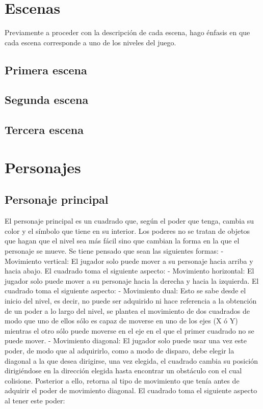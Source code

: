 \documentclass{article}
\begin{document}
\section{Escenas}
Previamente a proceder con la descripción de cada escena, hago énfasis en que cada escena corresponde a uno de los niveles del juego.
\subsection{Primera escena}

\subsection{Segunda escena}

\subsection{Tercera escena}

\section{Personajes}
\subsection{Personaje principal}
El personaje principal es un cuadrado que, según el poder que tenga, cambia su color y el símbolo que tiene en su interior. Los poderes no se tratan de objetos que hagan que el nivel sea más fácil sino que cambian la forma en la que el personaje se mueve. Se tiene pensado que sean las siguientes formas:
    - Movimiento vertical: El jugador solo puede mover a su personaje hacia arriba y hacia abajo. El cuadrado toma el siguiente aspecto:
    - Movimiento horizontal: El jugador solo puede mover a su personaje hacia la derecha y hacia la izquierda. El cuadrado toma el siguiente aspecto:
    - Movimiento dual: Esto se sabe desde el inicio del nivel, es decir, no puede ser adquirido ni hace referencia a la obtención de un poder a lo largo del nivel, se plantea el movimiento de dos cuadrados de modo que uno de ellos sólo es capaz de moverse en uno de los ejes (X ó Y) mientras el otro sólo puede moverse en el eje en el que el primer cuadrado no se puede mover.
    - Movimiento diagonal: El jugador solo puede usar una vez este poder, de modo que al adquirirlo, como a modo de disparo, debe elegir la diagonal a la que desea dirigirse, una vez elegida, el cuadrado cambia su posición dirigiéndose en la dirección elegida hasta encontrar un obstáculo con el cual colisione. Posterior a ello, retorna al tipo de movimiento que tenía antes de adquirir el poder de movimiento diagonal. El cuadrado toma el siguiente aspecto al tener este poder:
\end{document}
